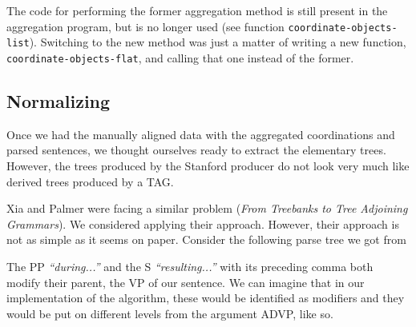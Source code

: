 \documentclass[a4paper]{article}
\begin{document}
The code for performing the former aggregation method is still present
in the aggregation program, but is no longer used (see function
\texttt{coordinate-objects-list}). Switching to the new method was
just a matter of writing a new function,
\texttt{coordinate-objects-flat}, and calling that one instead of the
former.

\subsection{Normalizing}

Once we had the manually aligned data with the aggregated
coordinations and parsed sentences, we thought ourselves ready to
extract the elementary trees. However, the trees produced by the
Stanford producer do not look very much like derived trees produced by
a TAG.

Xia and Palmer were facing a similar problem (\emph{From Treebanks to
Tree Adjoining Grammars}). We considered applying their approach.
However, their approach is not as simple as it seems on paper.
Consider the following parse tree we got from 


The PP \emph{``during...''} and the S \emph{``resulting...''} with its
preceding comma both modify their parent, the VP of our sentence. We
can imagine that in our implementation of the algorithm, these would
be identified as modifiers and they would be put on different levels
from the argument ADVP, like so.

\end{document}
